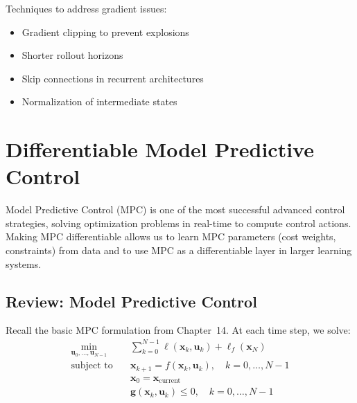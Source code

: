 Techniques to address gradient issues:
\begin{itemize}
    \item Gradient clipping to prevent explosions
    \item Shorter rollout horizons
    \item Skip connections in recurrent architectures
    \item Normalization of intermediate states
\end{itemize}


\section{Differentiable Model Predictive Control}
\label{sec:diff_mpc}

Model Predictive Control (MPC) is one of the most successful advanced control strategies, solving optimization problems in real-time to compute control actions. Making MPC differentiable allows us to learn MPC parameters (cost weights, constraints) from data and to use MPC as a differentiable layer in larger learning systems.

\subsection{Review: Model Predictive Control}

Recall the basic MPC formulation from Chapter~14. At each time step, we solve:
\begin{equation}
\begin{aligned}
\min_{\mathbf{u}_0, \ldots, \mathbf{u}_{N-1}} \quad & \sum_{k=0}^{N-1} \ell(\mathbf{x}_k, \mathbf{u}_k) + \ell_f(\mathbf{x}_N) \\
\text{subject to} \quad & \mathbf{x}_{k+1} = f(\mathbf{x}_k, \mathbf{u}_k), \quad k = 0, \ldots, N-1 \\
& \mathbf{x}_0 = \mathbf{x}_{\text{current}} \\
& \mathbf{g}(\mathbf{x}_k, \mathbf{u}_k) \leq 0, \quad k = 0, \ldots, N-1
\end{aligned}
\label{eq:mpc_basic}
\end{equation}

